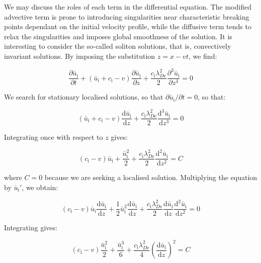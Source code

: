 We may discuss the roles of each term in the differential equation. The modified advective term is prone to introducing singularities near characteristic breaking points dependant on the initial velocity profile, while the diffusive term tends to relax the singularities and imposes global smoothness of the solution. It is interesting to consider the so-called soliton solutions, that is, convectively invariant solutions. By imposing the substitution $z=x-vt$, we find:

\begin{equation}
    \frac{\partial\bar{u}_\mathrm{i}}{\partial t}+(\bar{u}_\mathrm{i}+c_\mathrm{i}-v)\frac{\partial\bar{u}_\mathrm{i}}{\partial z}+\frac{c_\mathrm{i}\lambda_{D\text{e}}^2}{2}\frac{\partial^3\bar{u}_\mathrm{i}}{\partial z^3}=0
\end{equation}

We search for stationary localised solutions, so that $\partial\bar{u}_\mathrm{i}/\partial t=0$, so that:

\begin{equation}
    (\bar{u}_\mathrm{i}+c_\mathrm{i}-v)\frac{\mathrm{d}\bar{u}_\mathrm{i}}{\mathrm{d}z}+\frac{c_\mathrm{i}\lambda_{D\text{e}}^2}{2}\frac{\mathrm{d}^3\bar{u}_\mathrm{i}}{\mathrm{d}z^3}=0
\end{equation}

Integrating once with respect to $z$ gives:

\begin{equation}
    (c_\mathrm{i}-v)\bar{u}_\mathrm{i}+\frac{\bar{u}_\mathrm{i}^2}{2}+\frac{c_\mathrm{i}\lambda_{D\text{e}}^2}{2}\frac{\mathrm{d}^2\bar{u}_\mathrm{i}}{\mathrm{d}z^2}=C
\end{equation}

where $C=0$ because we are seeking a localised solution. Multiplying the equation by $\bar{u}_\mathrm{i}'$, we obtain:

\begin{equation}
    (c_\mathrm{i}-v)\bar{u}_\mathrm{i}\frac{\mathrm{d}\bar{u}_\mathrm{i}}{\mathrm{d}z}+\frac{1}{2}\bar{u}_\mathrm{i}^2\frac{\mathrm{d}\bar{u}_\mathrm{i}}{\mathrm{d}z}+\frac{c_\mathrm{i}\lambda_{D\text{e}}^2}{2}\frac{\mathrm{d}\bar{u}_\mathrm{i}}{\mathrm{d}z}\frac{\mathrm{d}^2\bar{u}_\mathrm{i}}{\mathrm{d}z^2}=0
\end{equation}

Integrating gives:

\begin{equation}
    (c_\mathrm{i}-v)\frac{\bar{u}_\mathrm{i}^2}{2}+\frac{\bar{u}_\mathrm{i}^3}{6}+\frac{c_\mathrm{i}\lambda_{D\text{e}}^2}{4}\left(\frac{\mathrm{d}\bar{u}_\mathrm{i}}{\mathrm{d}z}\right)^2=C
\end{equation}

